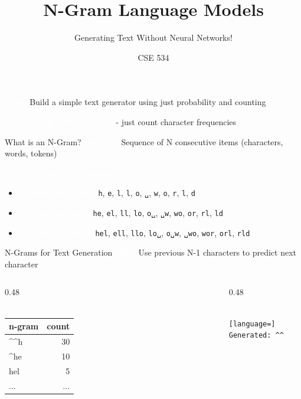 \documentclass[aspectratio=169]{beamer}
\title{N-Gram Language Models}
\subtitle{Generating Text Without Neural Networks!}
\author{CSE 534}
\date{}
\renewcommand{\textbf}[1]{\textcolor{white}{\bfseries #1}}
\begin{document}
\begin{frame}
\titlepage
\begin{center}
\textbf{Goal:} Build a simple text generator using just probability and counting

\textbf{No training GPUs needed} - just count character frequencies
\end{center}
\end{frame}

\begin{frame}[c]{What is an N-Gram?}
\textbf{N-gram:} Sequence of N consecutive items (characters, words, tokens)

\vspace{1em}
\textbf{Examples with ``hello␣world'':}
\begin{itemize}
    \item \textbf{1-gram (unigram):} \texttt{h}, \texttt{e}, \texttt{l}, \texttt{l}, \texttt{o}, \texttt{␣}, \texttt{w}, \texttt{o}, \texttt{r}, \texttt{l}, \texttt{d}
    \item \textbf{2-gram (bigram):} \texttt{he}, \texttt{el}, \texttt{ll}, \texttt{lo}, \texttt{o␣}, \texttt{␣w}, \texttt{wo}, \texttt{or}, \texttt{rl}, \texttt{ld}
    \item \textbf{3-gram (trigram):} \texttt{hel}, \texttt{ell}, \texttt{llo}, \texttt{lo␣}, \texttt{o␣w}, \texttt{␣wo}, \texttt{wor}, \texttt{orl}, \texttt{rld}
\end{itemize}
\end{frame}

\begin{frame}[c,fragile]{N-Grams for Text Generation}
\textbf{Idea:} Use previous N-1 characters to predict next character

\vspace{1em}
\begin{columns}[T]
\begin{column}{0.48\textwidth}
\textbf{N-grams from a large corpus (including ``hello''):}

\vspace{0.5em}
\begin{tabular}{|l|r|}
\hline
\rowcolor{codebg}
n-gram & count \\
\hline
\textasciicircum\textasciicircum h & 30 \\
\textasciicircum he & 10 \\
hel & 5 \\
... & ... \\
\hline
\end{tabular}
\end{column}

\begin{column}{0.48\textwidth}
\textbf{Current state:}
\begin{lstlisting}[language=]
Generated: ^^
\end{lstlisting}
\end{column}
\end{columns}
\end{frame}
\end{document}
